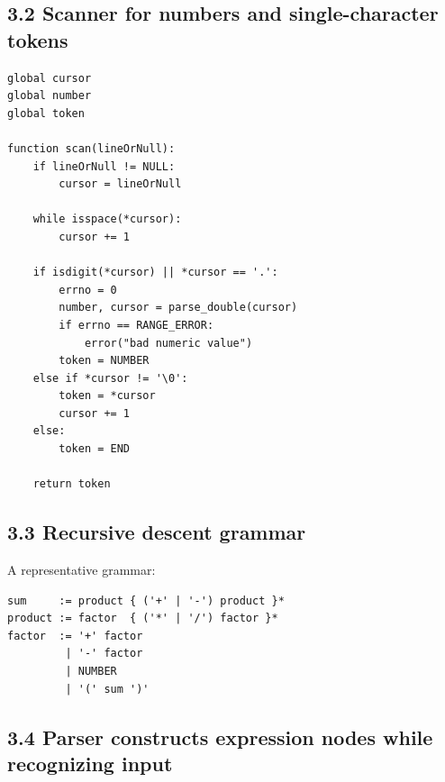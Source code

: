\documentclass[11pt]{article}
\begin{document}
\subsection{3.2 Scanner for numbers and single-character
tokens}\label{scanner-for-numbers-and-single-character-tokens}

\begin{verbatim}
global cursor
global number
global token

function scan(lineOrNull):
    if lineOrNull != NULL:
        cursor = lineOrNull

    while isspace(*cursor):
        cursor += 1

    if isdigit(*cursor) || *cursor == '.':
        errno = 0
        number, cursor = parse_double(cursor)
        if errno == RANGE_ERROR:
            error("bad numeric value")
        token = NUMBER
    else if *cursor != '\0':
        token = *cursor
        cursor += 1
    else:
        token = END

    return token
\end{verbatim}

\subsection{3.3 Recursive descent
grammar}\label{recursive-descent-grammar}

A representative grammar:

\begin{verbatim}
sum     := product { ('+' | '-') product }*
product := factor  { ('*' | '/') factor }*
factor  := '+' factor
         | '-' factor
         | NUMBER
         | '(' sum ')'
\end{verbatim}

\subsection{3.4 Parser constructs expression nodes while recognizing
input}\label{parser-constructs-expression-nodes-while-recognizing-input}
\end{document}
